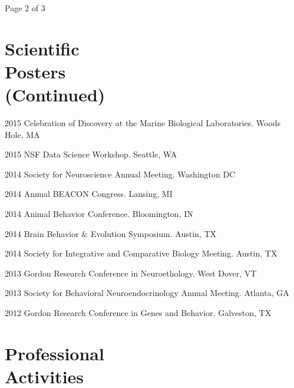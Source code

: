 \documentclass[margin,line]{resume}
\begin{document}
\begin{resume}
\vspace{0.5 cm}
{\centerline {Page 2 of 3}}
\newpage

\section{\mysidestyle Scientific\\Posters\\(Continued)}

\begin{list1}
\item[]2015	Celebration of Discovery at the Marine Biological Laboratories. Woods Hole, MA
\item[]2015	NSF Data Science Workshop. Seattle, WA
\item[]2014	Society for Neuroscience Annual Meeting. Washington DC
\item[]2014	Annual BEACON Congress. Lansing, MI
\item[]2014	Animal Behavior Conference. Bloomington, IN
\item[]2014	Brain Behavior \& Evolution Symposium. Austin, TX
\item[]2014	Society for Integrative and Comparative Biology Meeting. Austin, TX
\item[]2013	Gordon Research Conference in Neuroethology. West Dover, VT
\item[]2013	Society for Behavioral Neuroendocrinology Annual Meeting. Atlanta, GA
\item[]2012	Gordon Research Conference in Genes and Behavior. Galveston, TX

\end{list1}
    
    
    \section{\mysidestyle Professional\\Activities}


\end{resume}
\end{document}
